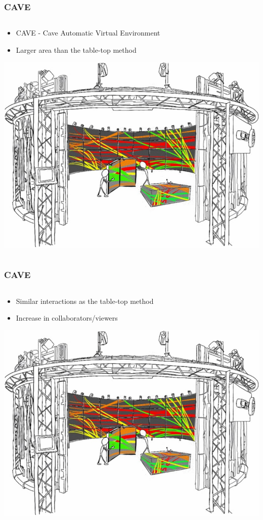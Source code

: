 \documentclass{beamer}
\begin{document}
\begin{frame}
\frametitle{CAVE}
	\begin{columns}
    \begin{column}{0.7\textwidth}
    \begin{itemize}
		\item CAVE - Cave Automatic Virtual Environment 
		\item Larger area than the table-top method
	\end{itemize}
	\includegraphics[width=\textwidth]{../Sample_paper/images/CAVE}	
	\end{column}
    \end{columns}
\end{frame}

\begin{frame}
\frametitle{CAVE}
\begin{columns}
    \begin{column}{0.7\textwidth}
    \begin{itemize}
		\item Similar interactions as the table-top method
		\item Increase in collaborators/viewers
	\end{itemize}
	\includegraphics[width=\textwidth]{../Sample_paper/images/CAVE}	
	\end{column}
    \end{columns}
\end{frame}
\end{document}
